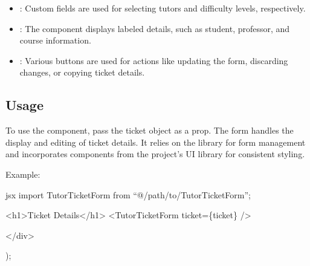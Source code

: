 \documentclass[letterpaper,10pt,english]{sphinxmanual}
\begin{document}
\begin{itemize}
\item {} 
\sphinxAtStartPar
{}: Custom fields are used for selecting tutors and difficulty levels, respectively.

\item {} 
\sphinxAtStartPar
{}: The  component displays labeled details, such as student, professor, and course information.

\item {} 
\sphinxAtStartPar
{}: Various buttons are used for actions like updating the form, discarding changes, or copying ticket details.

\end{itemize}


\subsection{Usage}
\label{\detokenize{forms/tutor:usage}}
\sphinxAtStartPar
To use the  component, pass the ticket object as a prop. The form handles the display and editing of ticket details. It relies on the  library for form management and incorporates components from the project’s UI library for consistent styling.

\sphinxAtStartPar
Example:

\sphinxAtStartPar
{\color{red}\bfseries{}\textasciigrave{}\textasciigrave{}}{\color{red}\bfseries{}\textasciigrave{}}jsx
import TutorTicketForm from “@/path/to/TutorTicketForm”;
\begin{description}
\begin{description}
\begin{description}
\sphinxAtStartPar
\textless{}h1\textgreater{}Ticket Details\textless{}/h1\textgreater{}
\textless{}TutorTicketForm ticket=\{ticket\} /\textgreater{}

\end{description}

\sphinxAtStartPar
\textless{}/div\textgreater{}

\end{description}

\sphinxAtStartPar
);

\end{description}
\end{document}
